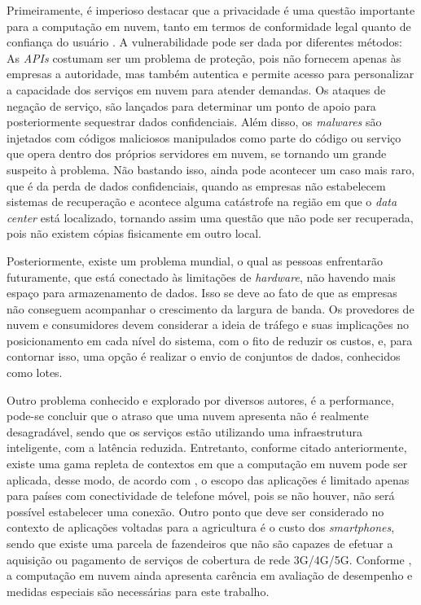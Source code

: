 \documentclass[12pt]{article}
\begin{document}
Primeiramente, é imperioso destacar que a privacidade é uma questão importante para a computação em nuvem, tanto em termos de conformidade legal quanto de confiança do usuário \cite{thakur}. A vulnerabilidade pode ser dada por diferentes métodos: As \emph{APIs} costumam ser um problema de proteção, pois não fornecem apenas às empresas a autoridade, mas também autentica e permite acesso para personalizar a capacidade dos serviços em nuvem para atender demandas. Os ataques de negação de serviço, são lançados para determinar um ponto de apoio para posteriormente sequestrar dados confidenciais. Além disso, os \emph{malwares} são injetados com códigos maliciosos manipulados como parte do código ou serviço que opera dentro dos próprios servidores em nuvem, se tornando um grande suspeito à problema. Não bastando isso, ainda pode acontecer um caso mais raro, que é da perda de dados confidenciais, quando as empresas não estabelecem sistemas de recuperação e acontece alguma catástrofe na região em que o \emph{data center} está localizado, tornando assim uma questão que não pode ser recuperada, pois não existem cópias fisicamente em outro local.

Posteriormente, existe um problema mundial, o qual as pessoas enfrentarão futuramente, que está conectado às limitações de \emph{hardware}, não havendo mais espaço para armazenamento de dados. Isso se deve ao fato de que as empresas não conseguem acompanhar o crescimento da largura de banda. Os provedores de nuvem e consumidores devem considerar a ideia de tráfego e suas implicações no posicionamento em cada nível do sistema, com o fito de reduzir os custos, e, para contornar isso, uma opção é realizar o envio de conjuntos de dados, conhecidos como lotes.

Outro problema conhecido e explorado por diversos autores, é a performance, pode-se concluir que o atraso que uma nuvem apresenta não é realmente desagradável, sendo que os serviços estão utilizando uma infraestrutura inteligente, com a latência reduzida. Entretanto, conforme citado anteriormente, existe uma gama repleta de contextos em que a computação em nuvem pode ser aplicada, desse modo, de acordo com \cite{prasad}, o escopo das aplicações é limitado apenas para países com conectividade de telefone móvel, pois se não houver, não será possível estabelecer uma conexão. Outro ponto que deve ser considerado no contexto de aplicações voltadas para a agricultura é o custo dos \emph{smartphones}, sendo que existe uma parcela de fazendeiros que não são capazes de efetuar a aquisição ou pagamento de serviços de cobertura de rede 3G/4G/5G. Conforme \cite{reza}, a computação em nuvem ainda apresenta carência em avaliação de desempenho e medidas especiais são necessárias para este trabalho.
\end{document}
